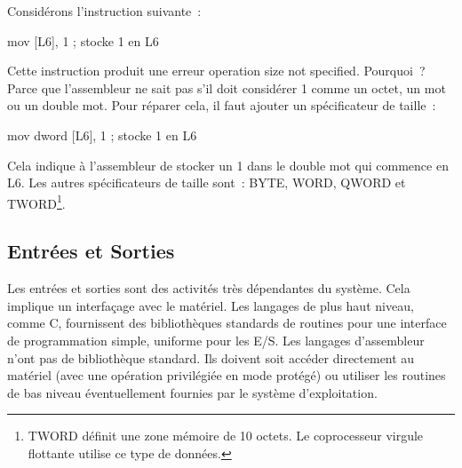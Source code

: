 Considérons l'instruction suivante~:
\begin{AsmCodeListing}[frame=none, numbers=none]
      mov    [L6], 1             ; stocke 1 en L6
\end{AsmCodeListing}
Cette instruction produit une erreur {\code operation size not specified}. Pourquoi~?
Parce que l'assembleur ne sait pas s'il doit considérer 1 comme un octet, un mot ou un
double mot. Pour réparer cela, il faut ajouter un spécificateur de taille~:
\begin{AsmCodeListing}[frame=none, numbers=none]
      mov    dword [L6], 1       ; stocke 1 en L6
\end{AsmCodeListing}
Cela indique à l'assembleur de stocker un 1 dans le double mot qui commence
en {\code L6}. Les autres spécificateurs de taille sont~: {\code BYTE},
{\code WORD}, {\code QWORD} et {\code TWORD}\footnote{{\code TWORD} 
définit une zone mémoire de 10 octets. Le coprocesseur virgule flottante utilise ce type de 
données.}.

\subsection{Entrées et Sorties}

Les entrées et sorties sont des activités très dépendantes du système.
Cela implique un interfaçage avec le matériel. Les langages de plus haut niveau,
comme C, fournissent des bibliothèques standards de routines pour une interface de programmation
simple, uniforme pour les E/S. Les langages d'assembleur n'ont pas de bibliothèque standard.
Ils doivent soit accéder directement au matériel (avec une opération privilégiée
en mode protégé) ou utiliser les routines de bas niveau éventuellement fournies par
le système d'exploitation.

